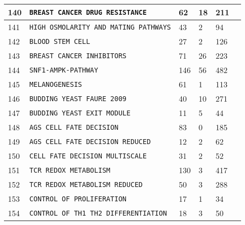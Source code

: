\documentclass{article}
\begin{document}
\begin{center}
\begin{tabular}{ | C{16pt} | C{149pt} | C{25pt} | C{25pt} | C{25pt} | C{36pt} | }
 		 & \texttt{BREAST CANCER DRUG RESISTANCE} & 62 & 18 & 211 & \cite{bbm-140} \\
 		 & \texttt{HIGH OSMOLARITY AND MATING PATHWAYS} & 43 & 2 & 94 & \cite{bbm-141, biomodels} \\
 		 & \texttt{BLOOD STEM CELL} & 27 & 2 & 126 & \cite{bbm-142, biomodels} \\
 		 & \texttt{BREAST CANCER INHIBITORS} & 71 & 26 & 223 & \cite{bbm-143} \\
 		 & \texttt{SNF1-AMPK-PATHWAY} & 146 & 56 & 482 & \cite{bbm-144} \\
 		 & \texttt{MELANOGENESIS} & 61 & 1 & 113 & \cite{bbm-145} \\
 		 & \texttt{BUDDING YEAST FAURE 2009} & 40 & 10 & 271 & \cite{bbm-146-147-159-180, ginsim} \\
 		 & \texttt{BUDDING YEAST EXIT MODULE} & 11 & 5 & 44 & \cite{bbm-146-147-159-180, ginsim} \\
 		 & \texttt{AGS CELL FATE DECISION} & 83 & 0 & 185 & \cite{bbm-148-149, ginsim} \\
 		 & \texttt{AGS CELL FATE DECISION REDUCED} & 12 & 2 & 62 & \cite{bbm-148-149, ginsim} \\
 		 & \texttt{CELL FATE DECISION MULTISCALE} & 31 & 2 & 52 & \cite{bbm-008-150, ginsim} \\
 		 & \texttt{TCR REDOX METABOLISM} & 130 & 3 & 417 & \cite{bbm-151-152, ginsim} \\
 		 & \texttt{TCR REDOX METABOLISM REDUCED} & 50 & 3 & 288 & \cite{bbm-151-152, ginsim} \\
 		 & \texttt{CONTROL OF PROLIFERATION} & 17 & 1 & 34 & \cite{bbm-153, ginsim} \\
 		 & \texttt{CONTROL OF TH1 TH2 DIFFERENTIATION} & 18 & 3 & 50 & \cite{bbm-154, ginsim} \\
 		\hline
 	\end{tabular}
 

\end{center}
\end{document}

